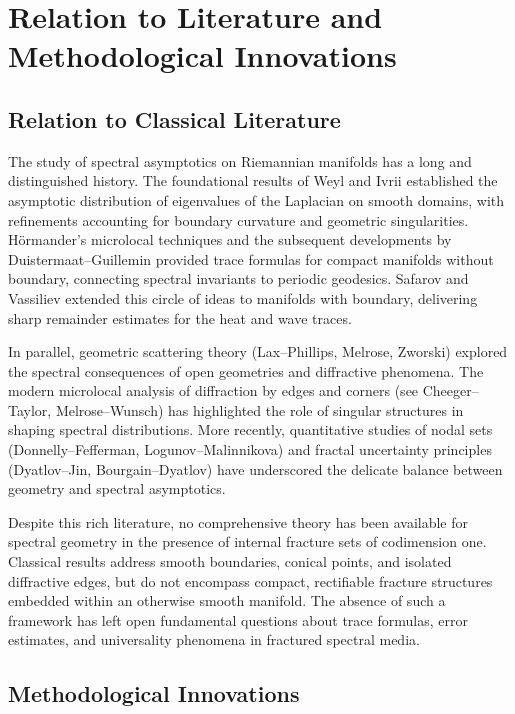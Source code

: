\section{Relation to Literature and Methodological Innovations}

\subsection*{Relation to Classical Literature}

The study of spectral asymptotics on Riemannian manifolds has a long and
distinguished history. The foundational results of Weyl and Ivrii
established the asymptotic distribution of eigenvalues of the Laplacian
on smooth domains, with refinements accounting for boundary curvature
and geometric singularities. Hörmander’s microlocal techniques and the
subsequent developments by Duistermaat–Guillemin provided trace formulas
for compact manifolds without boundary, connecting spectral invariants
to periodic geodesics. Safarov and Vassiliev extended this circle of
ideas to manifolds with boundary, delivering sharp remainder estimates
for the heat and wave traces.

In parallel, geometric scattering theory (Lax–Phillips, Melrose,
Zworski) explored the spectral consequences of open geometries and
diffractive phenomena. The modern microlocal analysis of diffraction by
edges and corners (see Cheeger–Taylor, Melrose–Wunsch) has highlighted
the role of singular structures in shaping spectral distributions. More
recently, quantitative studies of nodal sets (Donnelly–Fefferman,
Logunov–Malinnikova) and fractal uncertainty principles (Dyatlov–Jin,
Bourgain–Dyatlov) have underscored the delicate balance between geometry
and spectral asymptotics.

Despite this rich literature, no comprehensive theory has been available
for spectral geometry in the presence of internal fracture sets of
codimension one. Classical results address smooth boundaries, conical
points, and isolated diffractive edges, but do not encompass compact,
rectifiable fracture structures embedded within an otherwise smooth
manifold. The absence of such a framework has left open fundamental
questions about trace formulas, error estimates, and universality
phenomena in fractured spectral media.

\subsection*{Methodological Innovations}

